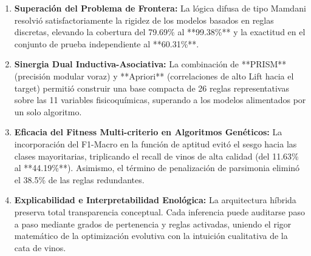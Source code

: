 \documentclass[11pt,a4paper]{article}
\begin{document}
\begin{enumerate}
    \item \textbf{Superación del Problema de Frontera:} La lógica difusa de tipo Mamdani resolvió satisfactoriamente la rigidez de los modelos basados en reglas discretas, elevando la cobertura del 79.69\% al **99.38\%** y la exactitud en el conjunto de prueba independiente al **60.31\%**.
    \item \textbf{Sinergia Dual Inductiva-Asociativa:} La combinación de **PRISM** (precisión modular voraz) y **Apriori** (correlaciones de alto Lift hacia el target) permitió construir una base compacta de 26 reglas representativas sobre las 11 variables fisicoquímicas, superando a los modelos alimentados por un solo algoritmo.
    \item \textbf{Eficacia del Fitness Multi-criterio en Algoritmos Genéticos:} La incorporación del F1-Macro en la función de aptitud evitó el sesgo hacia las clases mayoritarias, triplicando el recall de vinos de alta calidad (del 11.63\% al **44.19\%**). Asimismo, el término de penalización de parsimonia eliminó el 38.5\% de las reglas redundantes.
    \item \textbf{Explicabilidad e Interpretabilidad Enológica:} La arquitectura híbrida preserva total transparencia conceptual. Cada inferencia puede auditarse paso a paso mediante grados de pertenencia y reglas activadas, uniendo el rigor matemático de la optimización evolutiva con la intuición cualitativa de la cata de vinos.
\end{enumerate}
\end{document}
